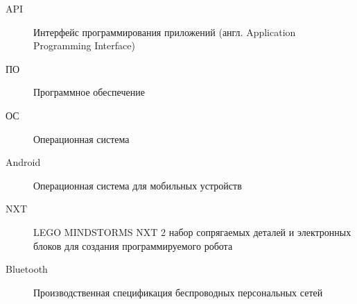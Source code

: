 \Abbreviations %
\begin{description}
\item[API] Интерфейс программирования приложений (англ. Application Programming Interface)
\item[ПО] Программное обеспечение
\item[ОС] Операционная система
\item[Android]  Операционная система для мобильных устройств
\item[NXT] LEGO MINDSTORMS NXT 2 набор сопрягаемых деталей и электронных блоков для создания программируемого робота
\item[Bluetooth] Производственная спецификация беспроводных персональных сетей
\end{description}

